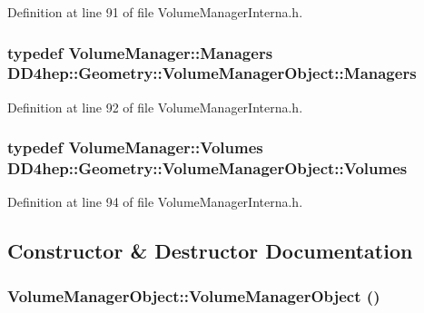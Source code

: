 Definition at line 91 of file VolumeManagerInterna.h.\hypertarget{class_d_d4hep_1_1_geometry_1_1_volume_manager_object_ad98004850761b06cd3a81c68cdcc0087}{
\subsubsection[{Managers}]{\setlength{\rightskip}{0pt plus 5cm}typedef {\bf VolumeManager::Managers} {\bf DD4hep::Geometry::VolumeManagerObject::Managers}}}
\label{class_d_d4hep_1_1_geometry_1_1_volume_manager_object_ad98004850761b06cd3a81c68cdcc0087}


Definition at line 92 of file VolumeManagerInterna.h.\hypertarget{class_d_d4hep_1_1_geometry_1_1_volume_manager_object_a6bbeb958237bc33c7228abada088f6a1}{
\subsubsection[{Volumes}]{\setlength{\rightskip}{0pt plus 5cm}typedef {\bf VolumeManager::Volumes} {\bf DD4hep::Geometry::VolumeManagerObject::Volumes}}}
\label{class_d_d4hep_1_1_geometry_1_1_volume_manager_object_a6bbeb958237bc33c7228abada088f6a1}


Definition at line 94 of file VolumeManagerInterna.h.

\subsection{Constructor \& Destructor Documentation}
\hypertarget{class_d_d4hep_1_1_geometry_1_1_volume_manager_object_ab52b36882ffec6a6b6023ae93f3d19bd}{
\subsubsection[{VolumeManagerObject}]{\setlength{\rightskip}{0pt plus 5cm}VolumeManagerObject::VolumeManagerObject ()}}
\label{class_d_d4hep_1_1_geometry_1_1_volume_manager_object_ab52b36882ffec6a6b6023ae93f3d19bd}


